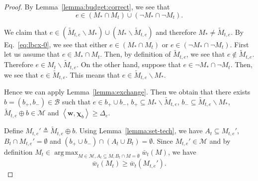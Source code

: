 \documentclass{article}
\newcommand{\M}{\mathcal M}
\newcommand{\B}{\mathcal B}
\newcommand{\del}{\backslash}
\DeclareMathOperator*{\argmax}{arg\,max}
\newcommand{\inn}[1]{\left\langle #1 \right\rangle}
\renewcommand{\vec}[1]{\boldsymbol{#1}}
\begin{document}
\begin{proof}
By Lemma~\ref{lemma:budget:correct}, we see that 
\begin{equation}
\label{eq:lbcx-0}
e \in (M_* \cap M_t) \cup ( \neg M_* \cap \neg M_t).
\end{equation}

We claim that $e\in (\tilde M_{t,e} \del M_*) \cup (M_* \del \tilde M_{t,e})$ and therefore $M_* \not= \tilde M_{t,e}$.
By Eq.~\eqref{eq:lbcx-0}, we see that either $e\in (M_* \cap M_t)$ or $e\in (\neg M_* \cap \neg M_t)$.
First let us assume that $e\in M_*\cap M_t$.
Then, by definition of $\tilde M_{t,e}$, we see that $e\not\in \tilde M_{t,e}$. Therefore $e\in M_t \del \tilde M_{t,e}$.
On the other hand, suppose that $e\in \neg M_* \cap \neg M_t$.
Then, we see that $e\in \tilde M_{t,e}$. This means that $e \in \tilde M_{t,e}\del M_*$.

Hence we can apply Lemma~\ref{lemma:exchange}. Then we obtain that there exists $b=(b_+,b_-)\in \B$ such that 
$e\in b_+\cup b_-$, $b_+\subseteq M_* \del \tilde M_{t,e}$, $b_- \subseteq \tilde M_{t,e} \del M_*$, $\tilde M_{t,e} \oplus b \in \M$ and 
$\inn{\vec w, \vec\chi_b} \ge \Delta_e$.

Define $M_{t,e}' \triangleq \tilde M_{t,e}\oplus b$. 
Using Lemma~\ref{lemma:set-tech}, we have 
$A_t \subseteq M_{t,e}'$, $B_t \cap M_{t,e}' = \emptyset$ and $(b_+\cup b_-) \cap (A_t \cup B_t) = \emptyset$.
Since $M_{t,e}'\in \M$ and by definition $M_t \in \argmax_{M\in \M, A_t\subseteq M, B_t \cap M = \emptyset} \bar w_t(M)$, we have
\begin{equation}
\label{eq:lbcx-1}
\bar w_t(M_t) \ge \bar w_t(M_{t,e}').
\end{equation}


\end{proof}
\end{document}
